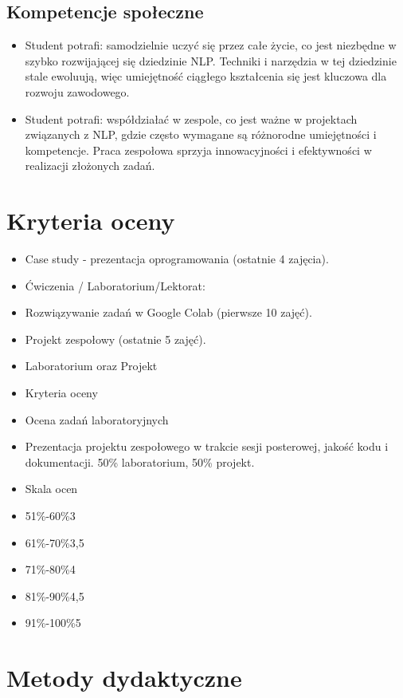 \documentclass[12pt, a4paper]{article}
\begin{document}
\subsection*{Kompetencje społeczne}
\begin{itemize}
  \item Student potrafi: samodzielnie uczyć się przez całe życie, co jest niezbędne w szybko rozwijającej się dziedzinie NLP. Techniki i narzędzia w tej dziedzinie stale ewoluują, więc umiejętność ciągłego kształcenia się jest kluczowa dla rozwoju zawodowego.
  \item Student potrafi: współdziałać w zespole, co jest ważne w projektach związanych z NLP, gdzie często wymagane są różnorodne umiejętności i kompetencje. Praca zespołowa sprzyja innowacyjności i efektywności w realizacji złożonych zadań.
\end{itemize}

\section{Kryteria oceny}

\begin{itemize}
  \item Case study - prezentacja oprogramowania (ostatnie 4 zajęcia).
  \item Ćwiczenia / Laboratorium/Lektorat:
  \item Rozwiązywanie zadań w Google Colab (pierwsze 10 zajęć).
  \item Projekt zespołowy (ostatnie 5 zajęć).
  \item Laboratorium oraz Projekt
  \item Kryteria oceny
  \item Ocena zadań laboratoryjnych
  \item Prezentacja projektu zespołowego w trakcie sesji posterowej, jakość kodu i dokumentacji. 50\% laboratorium, 50\% projekt.
  \item Skala ocen
  \item 51\%-60\%3
  \item 61\%-70\%3,5
  \item 71\%-80\%4
  \item 81\%-90\%4,5
  \item 91\%-100\%5
\end{itemize}

\section{Metody dydaktyczne}
\end{document}

